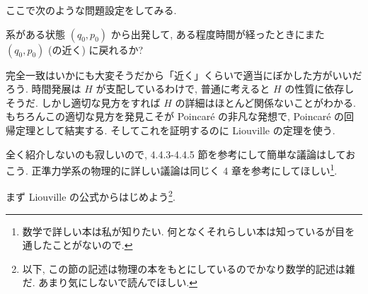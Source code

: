 \documentclass[openany, a4paper, oneside]{jsbook}
\begin{document}
ここで次のような問題設定をしてみる.
\begin{problem}
系がある状態 $(q_0, p_0)$ から出発して,
ある程度時間が経ったときにまた $(q_0, p_0)$ (の近く) に戻れるか?
\end{problem}
完全一致はいかにも大変そうだから「近く」くらいで適当にぼかした方がいいだろう.
時間発展は $H$ が支配しているわけで,
普通に考えると $H$ の性質に依存しそうだ.
しかし適切な見方をすれば $H$ の詳細はほとんど関係ないことがわかる.
もちろんこの適切な見方を発見こそが Poincar\'e の非凡な発想で,
Poincar\'e の回帰定理として結実する.
そしてこれを証明するのに Liouville の定理を使う.

全く紹介しないのも寂しいので,
\cite{NakamuraYamamoto1} 4.4.3-4.4.5 節を参考にして簡単な議論はしておこう.
正準力学系の物理的に詳しい議論は同じく \cite{NakamuraYamamoto1} 4 章を参考にしてほしい\footnote{数学で詳しい本は私が知りたい.
何となくそれらしい本は知っているが目を通したことがないので.}.

まず Liouville の公式からはじめよう\footnote{以下, この節の記述は物理の本をもとにしているのでかなり数学的記述は雑だ.
あまり気にしないで読んでほしい.}.
\end{document}
